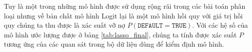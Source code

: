 \documentclass[a4paper]{report}\usepackage[]{graphicx}\usepackage[]{color}
\begin{document}



Tuy là một trong những mô hình được sử dụng rộng rãi trong các bài toán phân loại nhưng về bản chất mô hình Logit lại là một mô hình hồi quy với giá trị hồi quy chúng ta thu được là xác suất vỡ nợ $P(\texttt{DEFAULT} = \texttt{TRUE})$. Với các hệ số của mô hình ước lượng được ở bảng \ref{tab:lasso_final}, chúng ta tính được xác suất $P$ tương ứng của các quan sát trong bộ dữ liệu dùng để kiểm định mô hình. 
\end{document}
